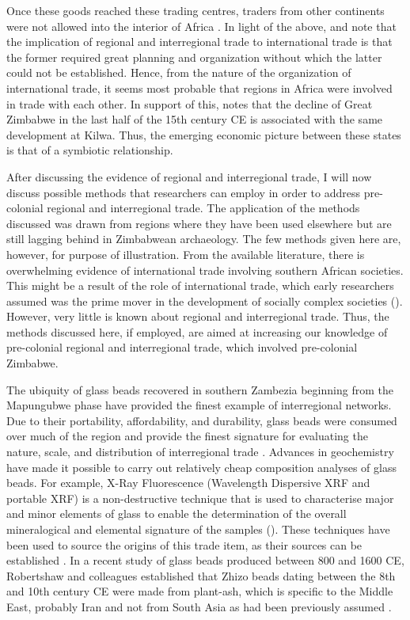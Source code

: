 Once these goods reached these trading centres, traders from other continents were not allowed into the interior of Africa \parencite{alradi1990}. In light of the above, \textcite{kusimba1999} and \textcite{manyanga2006} note that the implication of regional and interregional trade to international trade is that the former required great planning and organization without which the latter could not be established. Hence, from the nature of the organization of international trade, it seems most probable that regions in Africa were involved in trade with each other. In support of this, \textcite{pwiti2005} notes that the decline of Great Zimbabwe in the last half of the 15th century CE is associated with the same development at Kilwa. Thus, the emerging economic picture between these states is that of a symbiotic relationship.

After discussing the evidence of regional and interregional trade, I will now discuss possible methods that researchers can employ in order to address pre-colonial regional and interregional trade. The application of the methods discussed was drawn from regions where they have been used elsewhere but are still lagging behind in Zimbabwean archaeology. The few methods given here are, however, for purpose of illustration. From the available literature, there is overwhelming evidence of international trade involving southern African societies.  This might be a result of the role of international trade, which early researchers assumed was the prime mover in the development of socially complex societies (\cites{huffman1972}{huffman1982}{huffman1986}{huffman2009}). %
However, very little is known about regional and interregional trade. Thus, the methods discussed here, if employed, are aimed at increasing our knowledge of pre-colonial regional and interregional trade, which involved pre-colonial Zimbabwe.

The ubiquity of glass beads recovered in southern Zambezia beginning from the Mapungubwe phase have provided the finest example of interregional networks.  Due to their portability, affordability, and durability, glass beads were consumed over much of the region and provide the finest signature for evaluating the nature, scale, and distribution of interregional trade \parencite{dussubieux2008}.  Advances in geochemistry have made it possible to carry out relatively cheap composition analyses of glass beads.  For example, X-Ray Fluorescence (Wavelength Dispersive XRF and portable XRF) is a non-destructive technique that is used to characterise major and minor elements of glass to enable the determination of the overall mineralogical and elemental signature of the samples (\cite[][245]{pernicka2014}). These techniques have been used to source the origins of this trade item, as their sources can be established \parencite{wood2000}. In a recent study of glass beads produced between 800 and 1600 CE, Robertshaw and colleagues established that Zhizo beads dating between the 8th and 10th century CE were made from plant-ash, which is specific to the Middle East, probably Iran and not from South Asia as had been previously assumed \parencite{robertshaw2010}.


